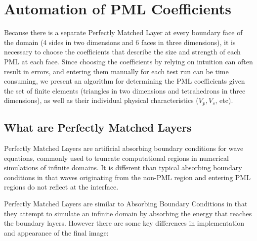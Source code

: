 \newpage
\section{Automation of PML Coefficients} \label{PML-Coefficient-Automation}

Because there is a separate Perfectly Matched Layer at every boundary face of the domain (4 sides in two dimensions and 6 faces in three dimensions), it is necessary to choose the coefficients that describe the size and strength of each PML at each face. Since choosing the coefficients by relying on intuition can often result in errors, and entering them manually for each test run can be time consuming, we present an algorithm for determining the PML coefficients given the set of finite elements (triangles in two dimensions and tetrahedrons in three dimensions), as well as their individual physical characteristics ($V_p, V_s$, etc).

\subsection{What are Perfectly Matched Layers}

Perfectly Matched Layers are artificial absorbing boundary conditions for wave equations, commonly used to truncate computational regions in numerical simulations of infinite domains. It is different than typical absorbing boundary conditions in that waves originating from the non-PML region and entering PML regions do not reflect at the interface.

Perfectly Matched Layers are similar to Absorbing Boundary Conditions in that they attempt to simulate an infinite domain by absorbing the energy that reaches the boundary layers. However there are some key differences in implementation and appearance of the final image:

